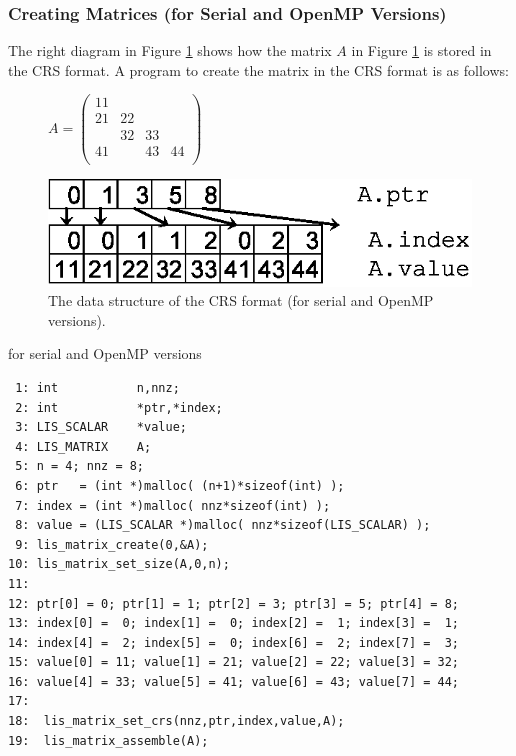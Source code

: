 \documentclass[a4paper]{article}
\begin{document}
\subsubsection{Creating Matrices (for Serial and OpenMP Versions)}
The right diagram in Figure \ref{fig:storage01} shows how the matrix $A$ in Figure \ref{fig:storage01} is stored in the CRS format. A program to create the matrix in the CRS format is as follows:
\begin{figure}[h]
{\centering 
\begin{minipage}{0.3\textwidth}
\begin{flushright}
$ \label{eq:mata}
A = \left(
\begin{array}{cccc}
11 &    &    &    \\
21 & 22 &    &    \\
   & 32 & 33 &    \\
41 &    & 43 & 44 \\
\end{array}\right)
$
\end{flushright}
\end{minipage}
\begin{minipage}{0.6\textwidth}
\begin{flushleft}
\includegraphics{storage01.eps} 
\end{flushleft}
\end{minipage}
\caption{The data structure of the CRS format (for serial and OpenMP versions).}\label{fig:storage01}}
\end{figure}
\begin{itembox}[l]{for serial and OpenMP versions}
\small
\begin{verbatim}
 1: int           n,nnz;
 2: int           *ptr,*index;
 3: LIS_SCALAR    *value;
 4: LIS_MATRIX    A;
 5: n = 4; nnz = 8;
 6: ptr   = (int *)malloc( (n+1)*sizeof(int) );
 7: index = (int *)malloc( nnz*sizeof(int) );
 8: value = (LIS_SCALAR *)malloc( nnz*sizeof(LIS_SCALAR) );
 9: lis_matrix_create(0,&A);
10: lis_matrix_set_size(A,0,n);
11:
12: ptr[0] = 0; ptr[1] = 1; ptr[2] = 3; ptr[3] = 5; ptr[4] = 8;
13: index[0] =  0; index[1] =  0; index[2] =  1; index[3] =  1;
14: index[4] =  2; index[5] =  0; index[6] =  2; index[7] =  3;
15: value[0] = 11; value[1] = 21; value[2] = 22; value[3] = 32;
16: value[4] = 33; value[5] = 41; value[6] = 43; value[7] = 44;
17:
18:  lis_matrix_set_crs(nnz,ptr,index,value,A);
19:  lis_matrix_assemble(A);
\end{verbatim}
\end{itembox}
\end{document}
